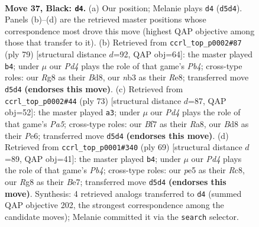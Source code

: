 \documentclass[11pt]{article}
\begin{document}
\clearpage

\begin{figure}[p]\centering
\begin{subfigure}{0.46\textwidth}\centering
\resizebox{\linewidth}{!}{%
\newchessgame
\chessboard[
  setfen={rn1b2r1/1pk2b1p/6pP/p2pPp2/P7/1NN3P1/1B5K/R2R4 b - - 18 37},
  showmover=false,
  pgfstyle=straightmove, color=movearrow, markmove={d5-d4}
]}
\caption{}
\end{subfigure}\hfill
\begin{subfigure}{0.46\textwidth}\centering
\resizebox{\linewidth}{!}{%
\newchessgame
\chessboard[
  setfen={3br1n1/2p2r2/2k5/1pp1Pp2/7p/2N4P/1PP3PB/R4R1K b - - 1 40},
  showmover=false,
  pgfstyle=straightmove, color=movearrow, markmove={b5-b4}
]}
\caption{}
\end{subfigure}
\\[4pt]
\begin{subfigure}{0.46\textwidth}\centering
\resizebox{\linewidth}{!}{%
\newchessgame
\chessboard[
  setfen={r3r3/5p1P/1k2pB2/1bp1P3/p1np2N1/5P2/2P2K2/R1R5 b - - 2 37},
  showmover=false,
  pgfstyle=straightmove, color=movearrow, markmove={a4-a3}
]}
\caption{}
\end{subfigure}\hfill
\begin{subfigure}{0.46\textwidth}\centering
\resizebox{\linewidth}{!}{%
\newchessgame
\chessboard[
  setfen={2r5/4bkp1/1r2b2p/npp5/5Pp1/P1B1P2P/3N2B1/1R1R2K1 b - - 1 35},
  showmover=false,
  pgfstyle=straightmove, color=movearrow, markmove={b5-b4}
]}
\caption{}
\end{subfigure}
\caption{\textbf{Move 37, Black: \texttt{d4}.} (a) Our position; Melanie plays \texttt{d4} (\texttt{d5d4}). Panels (b)--(d) are the retrieved master positions whose correspondence most drove this move (highest QAP objective among those that transfer to it). (b) Retrieved from \texttt{ccrl\_top\_p0002\#87} (ply 79) [structural distance $d$=92, QAP obj=64]: the master played \texttt{b4}; under $\mu$ our \emph{Pd4} plays the role of that game's \emph{Pb4}; cross-type roles: our \emph{R}g8 as their \emph{B}d8, our \emph{n}b3 as their \emph{R}e8; transferred move \texttt{d5d4} \textbf{(endorses this move)}. (c) Retrieved from \texttt{ccrl\_top\_p0002\#44} (ply 73) [structural distance $d$=87, QAP obj=52]: the master played \texttt{a3}; under $\mu$ our \emph{Pd4} plays the role of that game's \emph{Pa5}; cross-type roles: our \emph{B}f7 as their \emph{R}a8, our \emph{B}d8 as their \emph{P}e6; transferred move \texttt{d5d4} \textbf{(endorses this move)}. (d) Retrieved from \texttt{ccrl\_top\_p0001\#340} (ply 69) [structural distance $d$=89, QAP obj=41]: the master played \texttt{b4}; under $\mu$ our \emph{Pd4} plays the role of that game's \emph{Pb4}; cross-type roles: our \emph{p}e5 as their \emph{R}c8, our \emph{R}g8 as their \emph{B}e7; transferred move \texttt{d5d4} \textbf{(endorses this move)}. Synthesis: 4 retrieved analogs transferred to \texttt{d4} (summed QAP objective 202, the strongest correspondence among the candidate moves); Melanie committed it via the \texttt{search} selector.}
\label{fig:thought-m73}
\end{figure}
\end{document}
